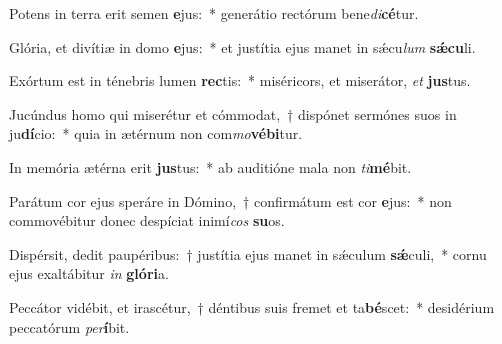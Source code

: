 \item Potens in terra erit semen \textbf{e}jus:~* generátio rectórum bene\textit{di}\textbf{cé}tur.
\item Glória, et divítiæ in domo \textbf{e}jus:~* et justítia ejus manet in sǽcu\textit{lum} \textbf{sǽ}\textbf{cu}li.
\item Exórtum est in ténebris lumen \textbf{rec}tis:~* miséricors, et miserátor, \textit{et} \textbf{jus}tus.
\item Jucúndus homo qui miserétur et cómmodat,~† dispónet sermónes suos in ju\textbf{dí}cio:~* quia in ætérnum non com\textit{mo}\textbf{vé}\textbf{bi}tur.
\item In memória ætérna erit \textbf{jus}tus:~* ab auditióne mala non \textit{ti}\textbf{mé}bit.
\item Parátum cor ejus speráre in Dómino,~† confirmátum est cor \textbf{e}jus:~* non commovébitur donec despíciat inimí\textit{cos} \textbf{su}os.
\item Dispérsit, dedit paupéribus:~† justítia ejus manet in sǽculum \textbf{sǽ}culi,~* cornu ejus exaltábitur \textit{in} \textbf{gló}\textbf{ri}a.
\item Peccátor vidébit, et irascétur,~† déntibus suis fremet et ta\textbf{bé}scet:~* desidérium peccatórum \textit{per}\textbf{í}bit.
